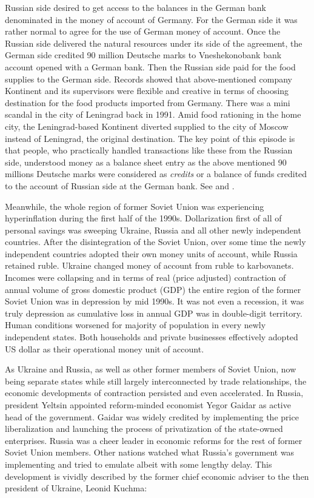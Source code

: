 Russian side desired to get access to the balances in the German bank
denominated in the money of account of Germany. For the German side it
was rather normal to agree for the use of German money of account. Once
the Russian side delivered the natural resources under its side of the
agreement, the German side credited 90 million Deutsche marks to
Vneshekonobank bank account opened with a German bank. Then the Russian
side paid for the food supplies to the German side. Records showed that
above-mentioned company Kontinent and its supervisors were flexible and
creative in terms of choosing destination for the food products imported
from Germany. There was a mini scandal in the city of Leningrad back in
1991. Amid food rationing in the home city, the Leningrad-based
Kontinent diverted supplied to the city of Moscow instead of Leningrad,
the original destination. The key point of this episode is that people,
who practically handled transactions like these from the Russian side,
understood money as a balance sheet entry as the above mentioned 90
millions Deutsche marks were considered as \textit{credits} or a balance of
funds credited to the account of Russian side at the German bank. See
\citep[pp.~104-105,118-124]{gessen2014} and \citep{gessen2017}.

Meanwhile, the whole region of former Soviet Union was experiencing
hyperinflation during the first half of the 1990s. Dollarization first
of all of personal savings was sweeping Ukraine, Russia and all other
newly independent countries. After the disintegration of the Soviet
Union, over some time the newly independent countries adopted their own
money units of account, while Russia retained ruble. Ukraine changed
money of account from ruble to karbovanets. Incomes were collapsing and
in terms of real (price adjusted) contraction of annual volume of gross
domestic product (GDP) the entire region of the former Soviet Union was
in depression by mid 1990s. It was not even a recession, it was truly
depression as cumulative loss in annual GDP was in double-digit
territory. Human conditions worsened for majority of population in every
newly independent states. Both households and private businesses
effectively adopted US dollar as their operational money unit of
account.

As Ukraine and Russia, as well as other former members of Soviet Union,
now being separate states while still largely interconnected by trade
relationships, the economic developments of contraction persisted and
even accelerated. In Russia, president Yeltsin appointed reform-minded
economist Yegor Gaidar as active head of the government. Gaidar was
widely credited by implementing the price liberalization and launching
the process of privatization of the state-owned enterprises. Russia was
a cheer leader in economic reforms for the rest of former Soviet Union
members. Other nations watched what Russia's government was implementing
and tried to emulate albeit with some lengthy delay. This development is
vividly described by the former chief economic adviser to the then
president of Ukraine, Leonid Kuchma:

